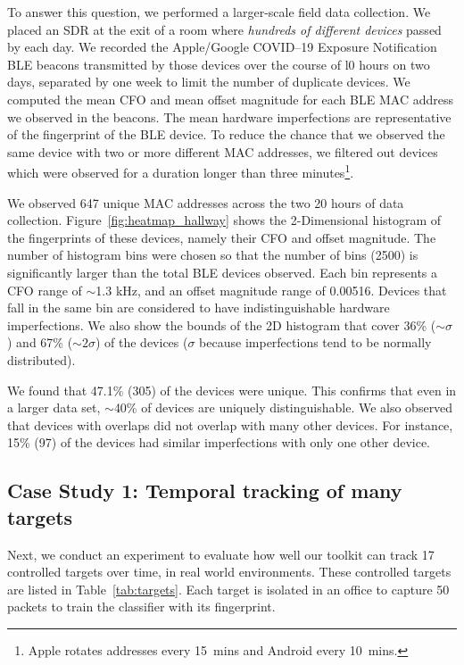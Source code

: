 To answer this question, we performed a larger-scale field data collection. We
placed an SDR at the exit of a room where \emph{hundreds of different
devices} passed by each day.  We recorded the Apple/Google COVID--19
Exposure Notification BLE beacons transmitted by those devices over the course of l0 hours on two days, separated by
one week to limit the number of duplicate devices. We computed the
mean CFO and mean \iq offset magnitude for each BLE MAC address
we observed in the beacons. The mean hardware imperfections are representative of the fingerprint of the BLE device. To reduce the chance that we observed the same
device with two or more different MAC addresses, we filtered out devices
which were observed for a duration longer than three minutes\footnote{Apple rotates addresses every 15~mins and Android every 10~mins.}. 

We observed 647 unique MAC addresses 
across the two 20 hours of data collection.
Figure~\ref{fig:heatmap_hallway} shows the 2-Dimensional histogram of the fingerprints of these devices, namely their CFO and \iq offset magnitude.
%
The number of histogram bins were chosen so that the number of bins (2500) is significantly larger than the total BLE devices observed. Each bin represents a CFO range of $\sim$1.3 kHz, and an \iq offset magnitude range of 0.00516.
%
Devices that fall in the same bin are considered to have indistinguishable hardware imperfections.
%
We also show the
bounds of the 2D histogram that cover 36\% ($\sim$$\sigma$) and
67\% ($\sim$$2\sigma$) of the devices ($\sigma$ because imperfections tend to be normally distributed). 

We found that 47.1\% (305) of the
devices were unique. This confirms that even
in a larger data set, $\sim$40\% of devices are uniquely distinguishable. We also observed that devices with overlaps did not
overlap with many other devices. For instance, 15\% (97) of the
devices had similar imperfections with only one other device. 


\subsection{Case Study 1: Temporal tracking of many targets}
\label{sec:results:case1}

Next, we conduct an experiment to evaluate how well our toolkit can track 17
controlled targets over time, in real world environments. 
These controlled targets are listed in Table~\ref{tab:targets}. Each target is isolated in an office to capture 50 packets to train the classifier with its fingerprint.
 
